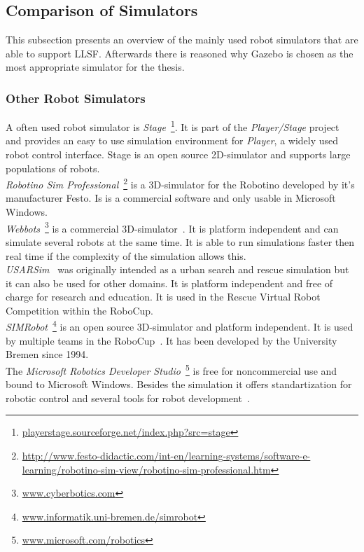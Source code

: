 \documentclass[11pt,a4paper,titlepage]{article}
\begin{document}
\subsection{Comparison of Simulators}
This subsection presents an overview of the mainly used robot simulators that are able to support LLSF. Afterwards there is reasoned why Gazebo is chosen as the most appropriate simulator for the thesis.
\subsubsection{Other Robot Simulators}
A often used robot simulator is \textit{Stage}~\footnote{\url{playerstage.sourceforge.net/index.php?src=stage}}. It is part of the \textit{Player/Stage} project~\cite{PlayerStage} and provides an easy to use simulation environment for \textit{Player}, a widely used robot control interface. Stage is an open source 2D-simulator and supports large populations of robots.\\
\textit{Robotino Sim Professional}~\footnote{\url{http://www.festo-didactic.com/int-en/learning-systems/software-e-learning/robotino-sim-view/robotino-sim-professional.htm}} is a 3D-simulator for the Robotino developed by it's manufacturer Festo. Is is a commercial software and only usable in Microsoft Windows.\\
\textit{Webbots}~\footnote{\url{www.cyberbotics.com}} is a commercial 3D-simulator~\cite{Webbots}. It is platform independent and can simulate several robots at the same time. It is able to run simulations faster then real time if the complexity of the simulation allows this.\\
\textit{USARSim}~\cite{USARSim} was originally intended as a urban search and rescue simulation but it can also be used for other domains. It is platform independent and free of charge for research and education. It is used in the Rescue Virtual Robot Competition within the RoboCup.\\
\textit{SIMRobot}~\footnote{\url{www.informatik.uni-bremen.de/simrobot}} is an open source 3D-simulator and platform independent. It is used by multiple teams in the RoboCup~\cite{SIMRobot}. It has been developed by the University Bremen since 1994.\\
The \textit{Microsoft Robotics Developer Studio}~\footnote{\url{www.microsoft.com/robotics}} is free for noncommercial use and bound to Microsoft Windows. Besides the simulation it offers standartization for robotic control and several tools for robot development~\cite{MicrosoftRoboticsStudio}.
\end{document}
